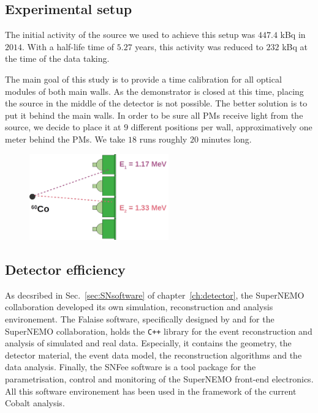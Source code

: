 
\subsection{Experimental setup}

The initial activity of the source we used to achieve this setup was $447.4$ kBq in $2014$.
With a half-life time of $5.27$ years, this activity was reduced to $232$ kBq at the time of the data taking.

The main goal of this study is to provide a time calibration for all optical modules of both main walls.
As the demonstrator is closed at this time, placing the source in the middle of the detector is not possible.
The better solution is to put it behind the main walls.
In order to be sure all PMs receive light from the source, we decide to place it at $9$ different positions per wall, approximatively one meter behind the PMs.
We take $18$ runs roughly $20$ minutes long.


\begin{figure}[h]
  \centering
  \includegraphics[width=6cm]{commissioning/fig_commissioning/Co_setup.pdf}
  \caption{
\label{fig:}}
\end{figure}

\subsection{Detector efficiency}

As decsribed in Sec.~\ref{sec:SNsoftware} of chapter~\ref{ch:detector}, the SuperNEMO collaboration developed its own simulation, reconstruction and analysis environement.
The Falaise software, specifically designed by and for the SuperNEMO collaboration, holds the \verb!C++! library for the event reconstruction and analysis of simulated and real data.
Especially, it contains the geometry, the detector material, the event data model, the reconstruction algorithms and the data analysis.
Finally, the SNFee software is a tool package for the parametrisation, control and monitoring of the SuperNEMO front-end electronics.
All this software environement has been used in the framework of the current Cobalt analysis.

